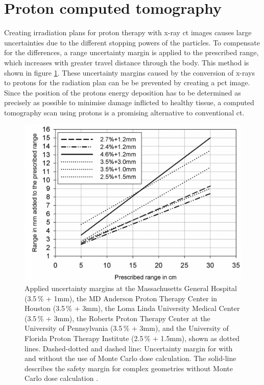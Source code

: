 \section{Proton computed tomography}
Creating irradiation plans for proton therapy with x-ray ct images causes large uncertainties due to the different stopping powers of the particles.
To compensate for the differences, a range uncertainty margin is applied to the prescribed range, which increases with greater travel distance through the body. This
method is shown in figure \ref{fig:paganetti}. These uncertainty margins caused by the conversion of x-rays to protons for the radiation plan can be be prevented by creating a pct image.
Since the position of the protons energy deposition has to be determined as precisely as possible to minimise damage inflicted to healthy tissue, a computed tomography scan using protons
is a promising alternative to conventional ct.

\begin{figure}
  \centering
  \includegraphics[height=0.6\textwidth]{images/prescription.png}
  \caption{Applied uncertainty margins at the Massachusetts General Hospital (3.5\,\% +
1mm), the MD Anderson Proton Therapy Center in Houston (3.5\,\% + 3mm), the Loma Linda
University Medical Center (3.5\,\% + 3mm), the Roberts Proton Therapy Center at the
University of Pennsylvania (3.5\,\% + 3mm), and the University of Florida Proton Therapy
Institute (2.5\,\% + 1.5mm), shown as dotted lines. Dashed-dotted and dashed line: Uncertainty margin for with and without the use of Monte Carlo dose calculation.
The solid-line describes the safety margin for complex geometries without Monte Carlo dose calculation \cite{paganetti}.}
  \label{fig:paganetti}
\end{figure}

